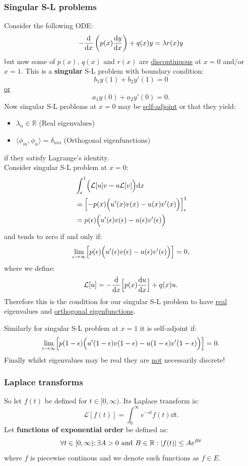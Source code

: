 \documentclass{article}
\begin{document}
\begin{multicols}{3}
\subsubsection*{Singular S-L problems}
Consider the following ODE:
$$-\dv{x}\left(p(x)\dv{y}{x}\right)+q(x)y=\lambda r(x)y$$
but now some of $p(x)$, $q(x)$ and $r(x)$ are \underline{discontinuous}
at $x=0$ and/or $x=1$.
This is a \textbf{singular} S-L problem with boundary condition:
$$b_1 y(1)+b_2 y'(1)=0$$
\underline{or}
$$a_1 y(0)+a_2 y'(0)=0.$$
Now singular S-L problems at $x=0$ may be
\underline{self-adjoint} or that they yield:
\begin{itemize}
    \item $\lambda_n\in\mathbb{R}$ (Real eigenvalues)
    \item $\langle \phi_m,\phi_n \rangle=\delta_{mn}$
    (Orthogonal eigenfunctions)
\end{itemize}
if they satisfy Lagrange's identity. \\
Consider singular S-L problem at $x=0$:
\begin{align*}
    &\int_{\epsilon}^{1}\Bigl(\mathcal{L}[u]v
    -u\mathcal{L}[v]\Bigr)\dd x \\
    &=\Bigl[-p(x)
    \Bigl(u'(x)v(x)-u(x)v'(x)\Bigr)\Bigr]_{\epsilon}^{1} \\
    &=p(\epsilon)
    \Bigl(u'(\epsilon)v(\epsilon)-u(\epsilon)v'(\epsilon)\Bigr)
\end{align*}
and tends to zero if and only if:
$$\lim_{\epsilon\rightarrow\infty}
\Bigl[p(\epsilon)
\Bigl(u'(\epsilon)v(\epsilon)-u(\epsilon)v'(\epsilon)\Bigr)\Bigr]=0,$$
where we define:
$$\mathcal{L}[u]=-\dv{x}\Bigl[p(x)\dv{u}{x}\Bigr]+q(x)u.$$
Therefore this is the condition for our singular S-L
problem to have \underline{real} eigenvalues and 
\underline{orthogonal eigenfunctions}.

Similarly for singular S-L problem at $x=1$ it is self-adjoint if:
$$\lim_{\epsilon\rightarrow\infty}
\Bigl[p(1-\epsilon)
\Bigl(u'(1-\epsilon)v(1-\epsilon)-u(1-\epsilon)v'(1-\epsilon)\Bigr)\Bigr]=0.$$
Finally whilst eigenvalues may be real they are \underline{not}
necessarily discrete!

\subsubsection*{Laplace transforms}
So let $f(t)$ be defined for $t\in[0,\infty)$. Its Laplace transform is:
$$\mathcal{L}[f(t)]=\int_{0}^{\infty}e^{-st}f(t)\dd t.$$
Let \textbf{functions of exponential order} be defined as:
$$\forall t\in[0,\infty);\exists A>0\hspace{0.05in}\text{and}\hspace{0.05in}
B\in\mathbb{R}:|f(t)|\leq Ae^{Bt}$$
where $f$ is piecewise continous and
we denote such functions as $f\in E$.


\end{multicols}
\end{document}
